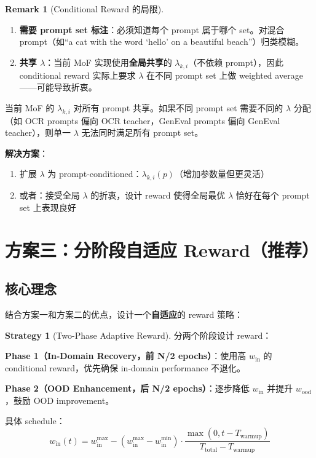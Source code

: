 \documentclass[11pt,a4paper]{article}
\theoremstyle{definition}
\newtheorem{remark}{Remark}
\newtheorem{strategy}{Strategy}
\begin{document}
\begin{remark}[Conditional Reward 的局限]
\begin{enumerate}[leftmargin=1.5em]
\item \textbf{需要 prompt set 标注}：必须知道每个 prompt 属于哪个 set。对混合 prompt（如``a cat with the word `hello' on a beautiful beach''）归类模糊。
\item \textbf{共享 $\lambda$}：当前 MoF 实现使用\textbf{全局共享}的 $\lambda_{k,i}$（不依赖 prompt），因此 conditional reward 实际上要求 $\lambda$ 在不同 prompt set 上做 weighted average——可能导致折衷。
\end{enumerate}
\end{remark}

\begin{tcolorbox}[colback=orange!5, colframe=orange!50, title=关键洞察：全局 $\lambda$ 的限制]
当前 MoF 的 $\lambda_{k,i}$ 对所有 prompt 共享。如果不同 prompt set 需要不同的 $\lambda$ 分配（如 OCR prompts 偏向 OCR teacher，GenEval prompts 偏向 GenEval teacher），则单一 $\lambda$ 无法同时满足所有 prompt set。

\textbf{解决方案}：
\begin{enumerate}
\item 扩展 $\lambda$ 为 prompt-conditioned：$\lambda_{k,i}(p)$（增加参数量但更灵活）
\item 或者：接受全局 $\lambda$ 的折衷，设计 reward 使得全局最优 $\lambda$ 恰好在每个 prompt set 上表现良好
\end{enumerate}
\end{tcolorbox}

\section{方案三：分阶段自适应 Reward（推荐）}
\label{sec:adaptive}

\subsection{核心理念}

结合方案一和方案二的优点，设计一个\textbf{自适应}的 reward 策略：

\begin{strategy}[Two-Phase Adaptive Reward]
\label{strat:adaptive}
分两个阶段设计 reward：

\textbf{Phase 1（In-Domain Recovery，前 N/2 epochs）}：使用高 $w_{\mathrm{in}}$ 的 conditional reward，优先确保 in-domain performance 不退化。

\textbf{Phase 2（OOD Enhancement，后 N/2 epochs）}：逐步降低 $w_{\mathrm{in}}$ 并提升 $w_{\mathrm{ood}}$，鼓励 OOD improvement。

具体 schedule：
\begin{equation}
w_{\mathrm{in}}(t) = w_{\mathrm{in}}^{\max} - (w_{\mathrm{in}}^{\max} - w_{\mathrm{in}}^{\min})\cdot \frac{\max(0, t - T_{\mathrm{warmup}})}{T_{\mathrm{total}} - T_{\mathrm{warmup}}}
\end{equation}
\end{strategy}
\end{document}

